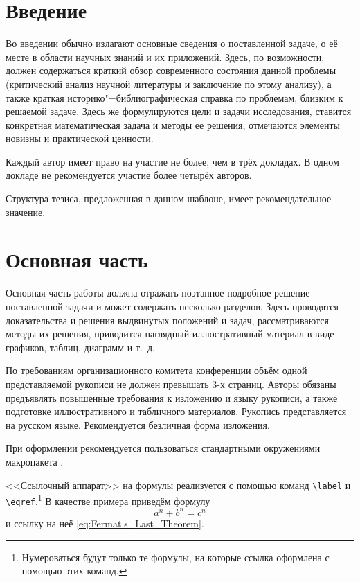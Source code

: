 \documentclass[60x84/16,8pt]{ittmm}
\begin{document}
\maketitle

\section{Введение}
\label{sec:intro}

Во введении обычно излагают основные сведения о поставленной задаче, о
её месте в области научных знаний и их приложений.  Здесь, по
возможности, должен содержаться краткий обзор современного состояния
данной проблемы (критический анализ научной литературы и заключение по
этому анализу), а также краткая историко"=библиографическая справка по
проблемам, близким к решаемой задаче.  Здесь же формулируются цели и
задачи исследования, ставится конкретная математическая задача и
методы ее решения, отмечаются элементы новизны и практической
ценности.

Каждый автор имеет право на участие не более, чем в трёх докладах.  В
одном докладе не рекомендуется участие более четырёх авторов.

Структура тезиса, предложенная в данном шаблоне, имеет
рекомендательное значение. 

\section{Основная часть} 
\label{sec:base-section}

Основная часть работы должна отражать поэтапное подробное решение
поставленной задачи и может содержать несколько разделов. Здесь
проводятся доказательства и решения выдвинутых положений и задач,
рассматриваются методы их решения, приводится наглядный иллюстративный
материал в виде графиков, таблиц, диаграмм и т.~д.

По требованиям организационного комитета конференции объём одной
представляемой рукописи не должен превышать 3-х страниц. Авторы
обязаны предъявлять повышенные требования к изложению и языку
рукописи, а также подготовке иллюстративного и табличного материалов.
Рукопись представляется на русском языке.  Рекомендуется безличная
форма изложения.

При оформлении рекомендуется пользоваться стандартными окружениями
макропакета \LaTeXe.

<<Ссылочный аппарат>> на формулы реализуется с помощью команд
\verb"\label" и \verb"\eqref".\footnote{Нумероваться будут только те
  формулы, на которые ссылка оформлена с помощью этих команд.}  В
качестве примера приведём формулу
\begin{equation}
a^n+b^n=c^n
\label{eq:Fermat's_Last_Theorem}
\end{equation}
и ссылку на неё \eqref{eq:Fermat's_Last_Theorem}.
\end{document}
